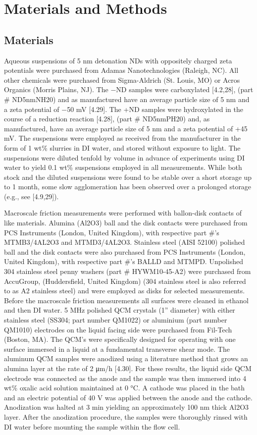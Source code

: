 \section{Materials and Methods}

\subsection{Materials}

Aqueous suspensions of 5 nm detonation NDs with oppositely charged zeta potentials were purchased from Adamas Nanotechnologies (Raleigh, NC). All other chemicals were purchased from Sigma-Aldrich (St. Louis, MO) or Acros Organics (Morris Plains, NJ). The −ND samples were carboxylated [4.2,28], (part \# ND5nmNH20) and as manufactured have an average particle size of 5 nm and a zeta potential of −50 mV [4.29]. The +ND samples were hydroxylated in the course of a reduction reaction [4.28], (part \# ND5nmPH20) and, as manufactured, have an average particle size of 5 nm and a zeta potential of +45 mV. The suspensions were employed as received from the manufacturer in the form of 1 wt\% slurries in DI water, and stored without exposure to light. The suspensions were diluted tenfold by volume in advance of experiments using DI water to yield 0.1 wt\% suspensions employed in all measurements. While both stock and the diluted suspensions were found to be stable over a short storage up to 1 month, some slow agglomeration has been observed over a prolonged storage (e.g., see [4.9,29]).

Macroscale friction measurements were performed with ballon-disk contacts of like materials. Alumina (Al2O3) ball and the disk contacts were purchased from PCS Instruments (London, United Kingdom), with respective part \#’s MTMB3/4AL2O3 and MTMD3/4AL2O3.
Stainless steel (AISI 52100) polished ball and the disk contacts were also purchased from PCS Instruments (London, United Kingdom), with respective part \#’s BALLD and MTMPD.
Unpolished 304 stainless steel penny washers (part \# HYWM10-45-A2) were purchased from AccuGroup, (Huddersfield, United Kingdom) (304 stainless steel is also referred to as A2 stainless steel) and were employed as disks for selected measurements. Before the macroscale friction measurements all surfaces were cleaned in ethanol and then DI water.
5 MHz polished QCM crystals (1” diameter) with either stainless steel (SS304; part number QM1022) or aluminium (part number QM1010) electrodes on the liquid facing side were purchased from Fil-Tech (Boston, MA). The QCM’s were specifically designed for operating with one surface immersed in a liquid at a fundamental transverse shear mode. The aluminum QCM samples were anodized using a literature method that grows an alumina layer at the rate of 2 μm/h [4.30]. For these results, the liquid side QCM electrode was connected as the anode and the sample was then immersed into 4 wt\% oxalic acid solution maintained at 0 °C. A cathode was placed in the bath and an electric potential of 40 V was applied between the anode and the cathode. Anodization was halted at 3 min yielding an approximately 100 nm thick Al2O3 layer. After the anodization procedure, the samples were thoroughly rinsed with DI water before mounting the sample within the flow cell.

